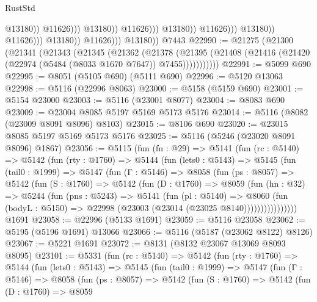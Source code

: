 \begin{lexlean}{RustStd}
\begin{coremodule}
                                                          @13180))
                                                      @11626)))
                                                @13180))
                                            @11626)))
                                      @13180))
                                  @11626)))
                            @13180))
                        @11626)))
                  @13180))
              @11626)))
        @13180))
    @7443
@22990 := @21275
    (@21300
      (@21341
        (@21343
          (@21345
            (@21362
              (@21378
                (@21395 (@21408 (@21416 (@21420 (@22974 (@5484 (@8033 @1670 @7647)) @7455)))))))))))
@22991 := @5099 @690
@22995 := @8051 (@5105 @690) (@5111 @690)
@22996 := @5120 @13063
@22998 := @5116 (@22996 @8063)
@23000 := @5158 (@5159 @690)
@23001 := @5154 @23000
@23003 := @5116 (@23001 @8077)
@23004 := @8083 @690
@23009 := @23004 @8085 @5197 @5169 @5173 @5176
@23014 := @5116 (@8082 (@23009 @8091 @8096) @8103)
@23015 := @8106 @690
@23020 := @23015 @8085 @5197 @5169 @5173 @5176
@23025 := @5116 (@5246 (@23020 @8091 @8096) @1867)
@23056 := @5115
    (fun (fn : @29) =>
    @5141
      (fun (rc : @5140) =>
      @5142
        (fun (rty : @1760) =>
        @5144
          (fun (lets0 : @5143) =>
          @5145
            (fun (tail0 : @1999) =>
            @5147
              (fun (Γ : @5146) =>
              @8058
                (fun (ps : @8057) =>
                @5142
                  (fun (S : @1760) =>
                  @5142
                    (fun (D : @1760) =>
                    @8059
                      (fun (hn : @32) =>
                      @5244
                        (fun (pns : @5243) =>
                        @5141
                          (fun (pl : @5140) =>
                          @8060
                            (fun (bodyL : @5150) =>
                            @22998 (@23003 (@23014 (@23025 @8140))))))))))))))))
    @1691
@23058 := @22996 (@5133 @1691)
@23059 := @5116 @23058
@23062 := @5195 (@5196 @1691) @13066
@23066 := @5116 (@5187 (@23062 @8122) @8126)
@23067 := @5221 @1691
@23072 := @8131 (@8132 @23067 @13069 @8093 @8095)
@23101 := @5331
    (fun (rc : @5140) =>
    @5142
      (fun (rty : @1760) =>
      @5144
        (fun (lets0 : @5143) =>
        @5145
          (fun (tail0 : @1999) =>
          @5147
            (fun (Γ : @5146) =>
            @8058
              (fun (ps : @8057) =>
              @5142
                (fun (S : @1760) =>
                @5142
                  (fun (D : @1760) =>
                  @8059

\end{coremodule}
\end{lexlean}
